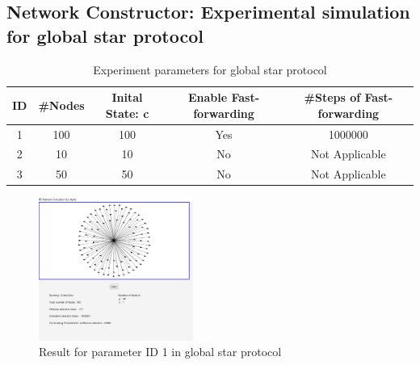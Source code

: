 \subsection{Network Constructor: Experimental simulation for global star protocol}

\FloatBarrier
\begin{table}[H]
\centering
\caption{Experiment parameters for global star protocol}
\label{starParas}
\begin{tabular}{|c|c|c|c|c|}
\hline
ID & \#Nodes & Inital State: c & Enable Fast-forwarding & \#Steps of  Fast-forwarding \\ \hline
1  & 100     & 100             & Yes                    & 1000000                     \\ \hline
2  & 10      & 10              & No                     & Not Applicable              \\ \hline
3  & 50      & 50              & No                     & Not Applicable              \\ \hline
\end{tabular}
\end{table}

\FloatBarrier
\begin{figure}[H]
\begin{center}
\includegraphics[width =0.45\textwidth]{context/diagram/GlobalStar_FastForwarding_Partial.png}
\caption{Result for parameter ID 1 in global star protocol}
\label{capture_star_res1}
\end{center}
\end{figure}

